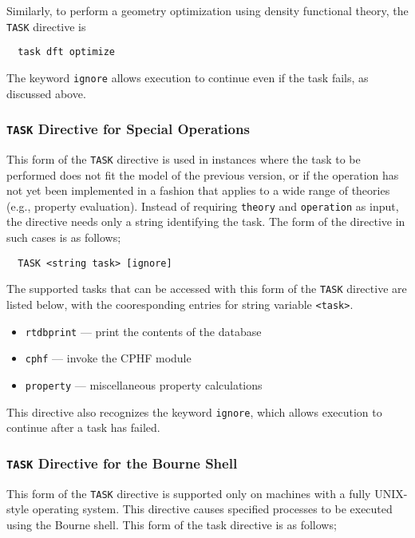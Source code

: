 Similarly, to perform a geometry optimization using density functional
theory, the \verb+TASK+ directive is
\begin{verbatim}
  task dft optimize
\end{verbatim}

The keyword \verb+ignore+ allows execution to continue even if the
task fails, as discussed above.

\subsubsection{{\tt TASK} Directive for Special Operations}

This form of the \verb+TASK+ directive is used in instances where the
task to be performed does not fit the model of the previous version, or
if the operation has not yet been implemented in a fashion that
applies to a wide range of theories (e.g., property evaluation).
Instead of requiring \verb+theory+ and \verb+operation+ as input, the
directive needs only a string identifying the task.  The form of the
directive in such cases is as follows;

\begin{verbatim}
  TASK <string task> [ignore]
\end{verbatim}

The supported tasks that can be accessed with this form of the \verb+TASK+
directive are listed
below, with the cooresponding entries for string variable \verb+<task>+.

\begin{itemize}
  \item \verb+rtdbprint+ --- print the contents of the database
  \item \verb+cphf+ --- invoke the CPHF module
  \item \verb+property+ --- miscellaneous property calculations
\end{itemize}

This directive also recognizes the keyword \verb+ignore+, which allows
execution to continue after a task has failed.

\subsubsection{{\tt TASK} Directive for the Bourne Shell}

This form of the \verb+TASK+ directive is supported only on machines
with a fully UNIX-style operating system.  This directive causes
specified processes to be executed using the Bourne shell.  This form
of the task directive is as follows;

